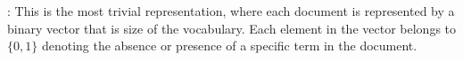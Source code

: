 
 : This is the most trivial representation, where each document is represented by a binary vector that is size of the vocabulary. Each element in the vector belongs to $\{0, 1\}$ denoting the absence or presence of a specific term in the document.

